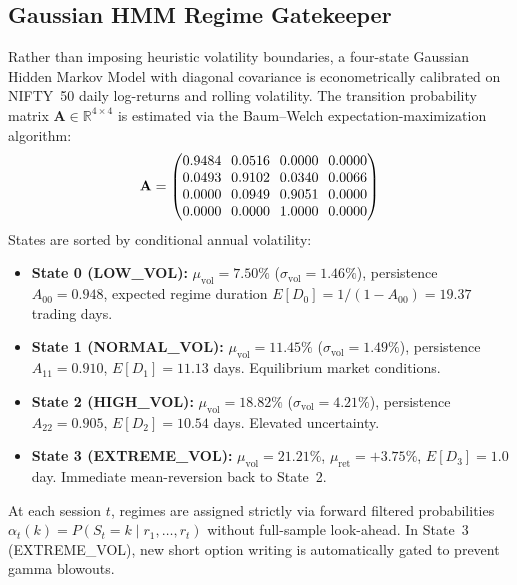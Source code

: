 \documentclass[journal]{IEEEtran}
\begin{document}
\subsection{Gaussian HMM Regime Gatekeeper}
Rather than imposing heuristic volatility boundaries, a four-state Gaussian Hidden Markov Model with diagonal covariance is econometrically calibrated on NIFTY~50 daily log-returns and rolling volatility. The transition probability matrix $\mathbf{A} \in \mathbb{R}^{4 \times 4}$ is estimated via the Baum--Welch expectation-maximization algorithm:
\begin{equation}
\setlength{\arraycolsep}{3.5pt}
\mathbf{A} = \begin{pmatrix}
0.9484 & 0.0516 & 0.0000 & 0.0000 \\
0.0493 & 0.9102 & 0.0340 & 0.0066 \\
0.0000 & 0.0949 & 0.9051 & 0.0000 \\
0.0000 & 0.0000 & 1.0000 & 0.0000
\end{pmatrix}
\end{equation}
States are sorted by conditional annual volatility:
\begin{itemize}
    \item \textbf{State 0 (LOW\_VOL):} $\mu_{\mathrm{vol}} = 7.50\%$ ($\sigma_{\mathrm{vol}} = 1.46\%$), persistence $A_{00} = 0.948$, expected regime duration $E[D_0] = 1/(1-A_{00}) = 19.37$ trading days.
    \item \textbf{State 1 (NORMAL\_VOL):} $\mu_{\mathrm{vol}} = 11.45\%$ ($\sigma_{\mathrm{vol}} = 1.49\%$), persistence $A_{11} = 0.910$, $E[D_1] = 11.13$ days. Equilibrium market conditions.
    \item \textbf{State 2 (HIGH\_VOL):} $\mu_{\mathrm{vol}} = 18.82\%$ ($\sigma_{\mathrm{vol}} = 4.21\%$), persistence $A_{22} = 0.905$, $E[D_2] = 10.54$ days. Elevated uncertainty.
    \item \textbf{State 3 (EXTREME\_VOL):} $\mu_{\mathrm{vol}} = 21.21\%$, $\mu_{\mathrm{ret}} = +3.75\%$, $E[D_3] = 1.0$ day. Immediate mean-reversion back to State~2.
\end{itemize}
At each session $t$, regimes are assigned strictly via forward filtered probabilities $\alpha_t(k) = P(S_t = k \mid r_1, \dots, r_t)$ without full-sample look-ahead. In State~3 (EXTREME\_VOL), new short option writing is automatically gated to prevent gamma blowouts.
\end{document}
